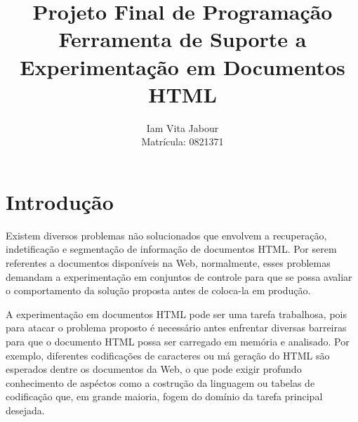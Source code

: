 \documentclass[12pt, a4paper]{article}
\begin{document}
\title{{\bf Projeto Final de Programação} \\ \bigskip Ferramenta de Suporte a Experimentação em Documentos HTML}
\author{Iam Vita Jabour \\ Matrícula: 0821371}
\maketitle


\section{Introdução}


Existem diversos problemas não solucionados que envolvem a
recuperação, indetificação e segmentação de 
informação de documentos HTML. Por serem referentes a documentos disponíveis
na Web, normalmente, esses problemas demandam a
experimentação em conjuntos de controle para que se possa avaliar o
comportamento da solução proposta antes de coloca-la em produção.


A experimentação em documentos HTML pode ser uma tarefa trabalhosa, pois
para atacar o problema proposto é necessário antes enfrentar diversas
barreiras para que o documento HTML possa ser carregado em memória e
analisado. Por exemplo, diferentes codificações de caracteres ou má geração do
HTML são esperados dentre os documentos da Web, o que pode 
exigir profundo conhecimento de aspéctos como a costrução da linguagem ou
tabelas de codificação que, em grande maioria, fogem do domínio da tarefa
principal desejada.

\end{document}
